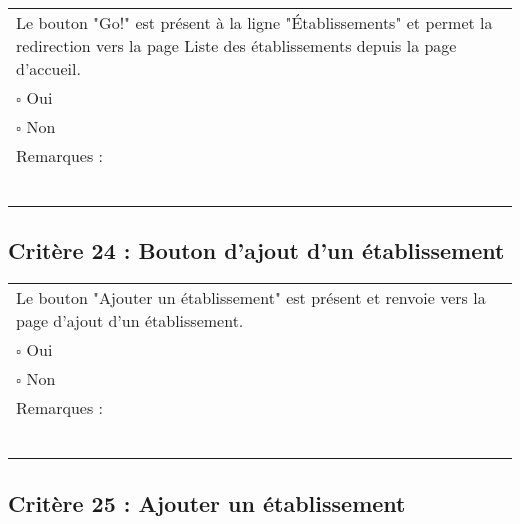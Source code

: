 	\begin{center}
    	 		\begin{tabular}[h]{|p{}|}
			\hline
				Le bouton "Go!" est présent à la ligne "Établissements" et permet la redirection vers la page Liste des établissements depuis la page d'accueil. \\
				$\square$ Oui  \\ $\square$ Non \\\hline Remarques : \\ ~\\
			 \\\hline
     		\end{tabular}
  		\end{center}	
  		
  		
  	\subsection*{Critère 24 : Bouton d'ajout d'un établissement}
	
	\begin{center}
    	 		\begin{tabular}[h]{|p{}|}
			\hline
				Le bouton "Ajouter un établissement" est présent et renvoie vers la page d'ajout d'un établissement. \\
				$\square$ Oui  \\ $\square$ Non \\\hline Remarques : \\ ~\\
			 \\\hline
     		\end{tabular}
  		\end{center}	
  		
  		
  	\subsection*{Critère 25 : Ajouter un établissement}
	
